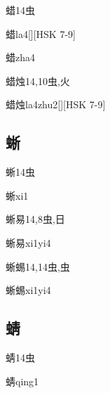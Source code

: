 \begin{Entry}{蜡}{14}{⾍}
  \begin{Phonetics}{蜡}{la4}[][HSK 7-9]
  \end{Phonetics}
  \begin{Phonetics}{蜡}{zha4}
  \end{Phonetics}
\end{Entry}

\begin{Entry}{蜡烛}{14,10}{⾍,⽕}
  \begin{Phonetics}{蜡烛}{la4zhu2}[][HSK 7-9]
  \end{Phonetics}
\end{Entry}

\subsection*{蜥}

\begin{Entry}{蜥}{14}{⾍}
  \begin{Phonetics}{蜥}{xi1}
  \end{Phonetics}
\end{Entry}

\begin{Entry}{蜥易}{14,8}{⾍,⽇}
  \begin{Phonetics}{蜥易}{xi1yi4}
  \end{Phonetics}
\end{Entry}

\begin{Entry}{蜥蜴}{14,14}{⾍,⾍}
  \begin{Phonetics}{蜥蜴}{xi1yi4}
  \end{Phonetics}
\end{Entry}

\subsection*{蜻}

\begin{Entry}{蜻}{14}{⾍}
  \begin{Phonetics}{蜻}{qing1}
  \end{Phonetics}
\end{Entry}


